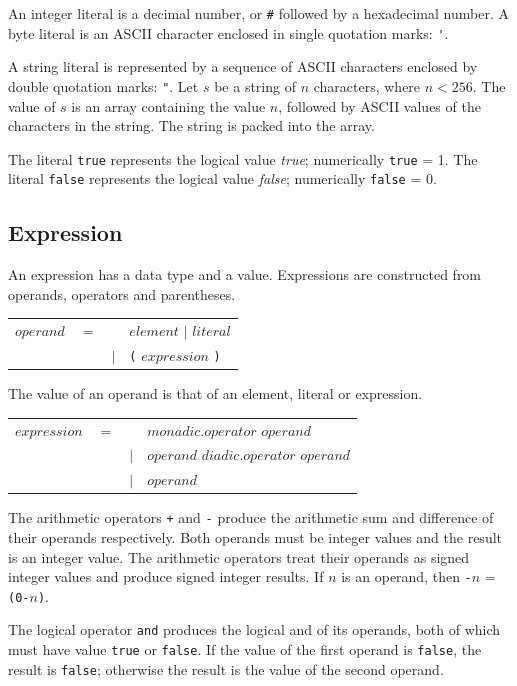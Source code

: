 \documentclass[a4paper, 12pt]{article}
\begin{document}
An integer literal is a decimal number, or \verb|#| followed by a hexadecimal number. A byte literal is an ASCII
character enclosed in single quotation marks: \verb|'|.

A string literal is represented by a sequence of ASCII characters enclosed by double quotation marks: \verb|"|. Let $s$ be a
string of $n$ characters, where $n<256$. The value of $s$ is an array containing the value $n$, followed by ASCII values of 
the characters in the string. The string is packed into the array. 

The literal \verb|true| represents the logical value {\it true}; numerically \verb|true| = 1. The literal \verb|false| represents the
logical value {\it false}; numerically \verb|false| = 0.  
 
\subsection*{Expression}

An expression has a data type and a value. Expressions are constructed from operands, operators and parentheses.

\begin{tabular}{llll}
$operand$ & $=$&& $element$ $|$ $literal$ \\
                     &&$|$&\verb|(| $expression$ \verb|)| 
\end{tabular}   

The value of an operand is that of an element, literal or expression. 

\begin{tabular}{llll}
$expression$    & $=$ &&$monadic.operator$ $operand$\\
                 &&$|$ & $operand$ $diadic.operator$ $operand$ \\
                 &&$|$ & $operand$ 
\end{tabular}  

The arithmetic operators \verb|+| and \verb|-| produce the arithmetic sum and difference of their 
operands respectively. 
Both operands must be integer values and the result is an integer value. The arithmetic operators treat their
operands as signed integer values and produce signed integer results. If $n$ is an operand, then \verb|-|$n$ = \verb|(0-|$n$\verb|)|. 

The logical operator \verb|and| produces the logical and of its operands,
both of which must have value  \verb|true| or \verb|false|. If the value of the first operand 
is \verb|false|, the result is \verb|false|; otherwise the result is the value of the second operand. 
\end{document}

